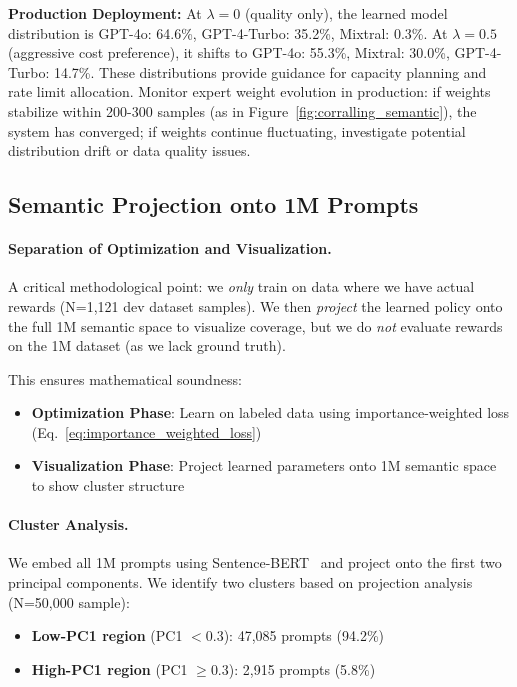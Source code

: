 \textbf{Production Deployment:} At $\lambda=0$ (quality only), the learned model distribution is GPT-4o: 64.6\%, GPT-4-Turbo: 35.2\%, Mixtral: 0.3\%.
At $\lambda=0.5$ (aggressive cost preference), it shifts to GPT-4o: 55.3\%, Mixtral: 30.0\%, GPT-4-Turbo: 14.7\%.
These distributions provide guidance for capacity planning and rate limit allocation. Monitor expert weight evolution in production: if weights stabilize within 200-300 samples (as in Figure~\ref{fig:corralling_semantic}), the system has converged; if weights continue fluctuating, investigate potential distribution drift or data quality issues.



\subsection{Semantic Projection onto 1M Prompts}
\label{sec:semantic_projection}

\paragraph{Separation of Optimization and Visualization.}
A critical methodological point: we \emph{only} train on data where we have actual rewards (N=1,121 dev dataset samples).
We then \emph{project} the learned policy onto the full 1M semantic space to visualize coverage, but we do \emph{not} evaluate rewards on the 1M dataset (as we lack ground truth).

This ensures mathematical soundness:
\begin{itemize}[nosep]
    \item \textbf{Optimization Phase}: Learn on labeled data using importance-weighted loss (Eq.~\ref{eq:importance_weighted_loss})
    \item \textbf{Visualization Phase}: Project learned parameters onto 1M semantic space to show cluster structure
\end{itemize}

\paragraph{Cluster Analysis.}
We embed all 1M prompts using Sentence-BERT~\cite{reimers2019sentence} and project onto the first two principal components.
We identify two clusters based on projection analysis (N=50,000 sample):
\begin{itemize}[nosep]
    \item \textbf{Low-PC1 region} (PC1 $< 0.3$): 47,085 prompts (94.2\%)
    \item \textbf{High-PC1 region} (PC1 $\geq 0.3$): 2,915 prompts (5.8\%)
\end{itemize}


